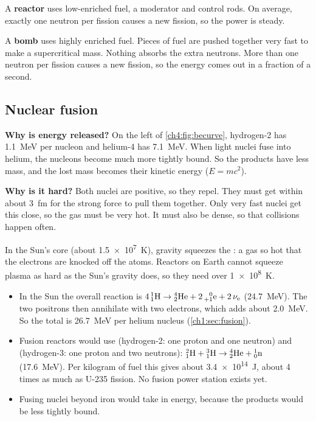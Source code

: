 A \textbf{reactor} uses low-enriched fuel, a moderator and control rods. On average,
exactly one neutron per fission causes a new fission, so the power is steady.

A \textbf{bomb} uses highly enriched fuel. Pieces of fuel are pushed together very
fast to make a supercritical mass. Nothing absorbs the extra neutrons. More than one
neutron per fission causes a new fission, so the energy comes out in a fraction of a
second.

\subsection{Nuclear fusion}

\textbf{Why is energy released?} On the left of \cref{ch4:fig:becurve}, hydrogen-2 has
\qty{1.1}{MeV} per nucleon and helium-4 has \qty{7.1}{MeV}. When light nuclei fuse
into helium, the nucleons become much more tightly bound. So the products have less
mass, and the lost mass becomes their kinetic energy ($E = mc^2$).

\textbf{Why is it hard?} Both nuclei are positive, so they repel. They must get
within about \qty{3}{fm} for the strong force to pull them together. Only very fast
nuclei get this close, so the gas must be very hot. It must also be dense, so that
collisions happen often.

In the Sun's core (about \qty{1.5e7}{K}), gravity squeezes the : a gas
so hot that the electrons are knocked off the atoms. Reactors on Earth cannot squeeze
plasma as hard as the Sun's gravity does, so they need over \qty{1e8}{K}.
\begin{itemize}
  \item In the Sun the overall reaction is
        $4\,\chFourNuc{1}{1}{H} \to \chFourAlpha + 2\,\chFourPos + 2\,\chFourNu$
        (\qty{24.7}{MeV}). The two positrons then annihilate with two electrons,
        which adds about \qty{2.0}{MeV}. So the total is \qty{26.7}{MeV} per helium
        nucleus (\cref{ch1:sec:fusion}).
  \item Fusion reactors would use  (hydrogen-2: one proton and one
        neutron) and  (hydrogen-3: one proton and two neutrons):
        $\chFourNuc{2}{1}{H} + \chFourNuc{3}{1}{H} \to \chFourAlpha + \chFourNeut$
        (\qty{17.6}{MeV}). Per kilogram of fuel this gives about
        \qty{3.4e14}{J}, about 4 times as much as U-235 fission. No fusion power
        station exists yet.
  \item Fusing nuclei beyond iron would take in energy, because the products would be
        less tightly bound.
\end{itemize}

